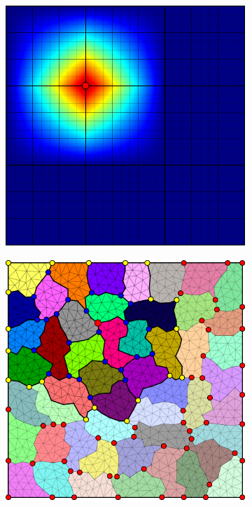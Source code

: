 \begin{figure}[htbp]
\begin{subfigure}[t]{0.3\textwidth}
  \end{subfigure}
  \hfill
  \begin{subfigure}[t]{0.3\textwidth}
    \centerline{\includegraphics[width=0.9\linewidth]{figs/square_cart_struct_node_ml_lvl2_basis}}
  \end{subfigure}
  \par\bigskip
  \begin{subfigure}[t]{0.3\textwidth}
    \centerline{\includegraphics[width=0.9\linewidth]{figs/square_tria_metis_node_ml_lvl1_grid}}

\end{subfigure}
\end{figure}
